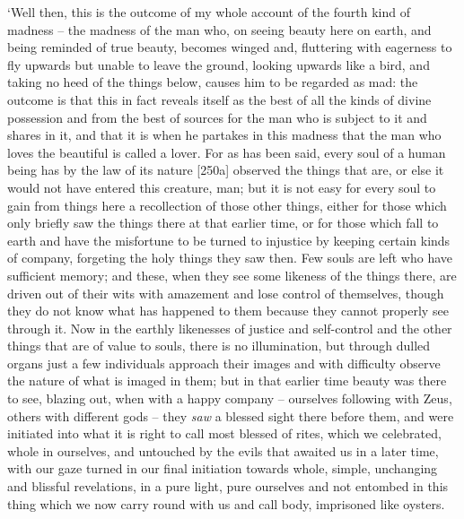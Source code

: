 ‘Well then, this is the outcome of my whole account of the 
fourth kind of madness -- the madness of the man who, on seeing beauty
here on earth, and being reminded of true beauty, becomes winged and,
fluttering with eagerness to fly upwards but unable to leave the ground,
looking upwards like a bird, and taking no heed of the things below,
causes him to be  regarded as
mad: the outcome is that
this in fact reveals itself as the best of all the kinds of divine
possession and from the best of sources for the man who is subject to it
and shares in it, and that it is when he partakes in this madness that
the man who loves the
beautiful is called a
lover. For as has been said, every soul of a human being has by the law
of its nature {[}250a{]} observed the things that are, or else it would
not have entered this creature, man; but it is not easy for every soul
to gain from things here a recollection of those other things, either
for those which only briefly saw the things there at that earlier time,
or for those which fall to earth and have the misfortune to be turned to
injustice by keeping certain kinds of company, forgeting  the
holy things they saw then. Few souls are left who have sufficient
memory; and these, when they see some likeness of the things there, are
driven out of their wits with amazement and lose control of themselves,
though they do not know what  has happened to them because they
cannot properly see through it. Now in the earthly likenesses of justice
and self-control and the other things that are of value to souls, there
is no illumination, but through dulled organs just a few individuals
approach their images and with difficulty observe the nature of what is
 imaged in them; but in that earlier time beauty was there to
see, blazing out, when with a happy company --
ourselves following with
Zeus, others with different gods -- they {\em saw} a blessed sight there
before them, and were initiated into what it is right to call most
blessed of rites, which we celebrated, whole  in ourselves, and
untouched by the evils that awaited us in a later time, with our gaze
turned in our final initiation towards whole, simple, unchanging and
blissful revelations, in a pure light, pure ourselves and not entombed
in this thing which we  now carry round with us and call body,
imprisoned like oysters.

